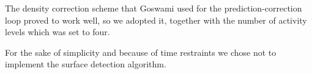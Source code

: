 \documentclass[../../main.tex]{subfiles}
\begin{document}
The density correction scheme that Goswami used for the prediction-correction loop proved to work well, so we adopted it, together with the number of activity levels which was set to four. 


For the sake of simplicity and because of time restraints we chose not to implement the surface detection algorithm. %


\end{document}
